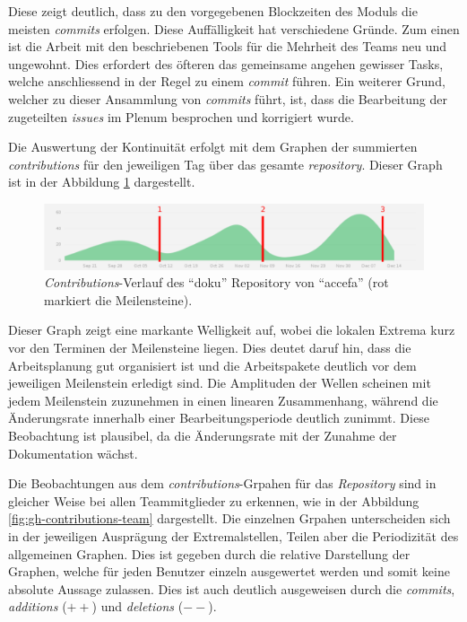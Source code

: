 Diese zeigt deutlich, dass zu den vorgegebenen Blockzeiten des Moduls
die meisten \emph{commits} erfolgen. Diese Auffälligkeit hat verschiedene
Gründe. Zum einen ist die Arbeit mit den beschriebenen Tools für die
Mehrheit des Teams neu und ungewohnt. Dies erfordert des öfteren das
gemeinsame angehen gewisser Tasks, welche anschliessend in der Regel zu
einem \emph{commit} führen. Ein weiterer Grund, welcher zu dieser
Ansammlung von \emph{commits} führt, ist, dass die Bearbeitung der
zugeteilten \emph{issues} im Plenum besprochen und korrigiert wurde.

Die Auswertung der Kontinuität erfolgt mit dem Graphen der summierten
\emph{contributions} für den jeweiligen Tag über das gesamte
\emph{repository}. Dieser Graph ist in der Abbildung 
\ref{fig:gh-contributions-ov} dargestellt.

\begin{figure}[h!]
	\centering
	\includegraphics[width=1\textwidth]{../../fig/pm/gh-contributions-ov_marked.pdf}
	\caption{\emph{Contributions}-Verlauf des ``doku'' Repository
		von ``accefa'' (rot markiert die Meilensteine).}
	\label{fig:gh-contributions-ov}
\end{figure}

Dieser Graph zeigt eine markante Welligkeit auf, wobei die lokalen Extrema
kurz vor den Terminen der Meilensteine liegen. Dies deutet daruf hin, dass
die Arbeitsplanung gut organisiert ist und die Arbeitspakete deutlich vor
dem jeweiligen Meilenstein erledigt sind. Die Amplituden der Wellen
scheinen mit jedem Meilenstein zuzunehmen in einen linearen Zusammenhang,
während die Änderungsrate innerhalb einer Bearbeitungsperiode deutlich zunimmt.
Diese Beobachtung ist plausibel, da die Änderungsrate mit der Zunahme der
Dokumentation wächst.

Die Beobachtungen aus dem \emph{contributions}-Grpahen für das
\emph{Repository} sind in gleicher Weise bei allen Teammitglieder zu erkennen,
wie in der Abbildung \ref{fig:gh-contributions-team} dargestellt. Die einzelnen
Grpahen unterscheiden sich in der jeweiligen Ausprägung der Extremalstellen,
Teilen aber die Periodizität des allgemeinen Graphen. Dies ist gegeben durch
die relative Darstellung der Graphen, welche für jeden Benutzer einzeln
ausgewertet werden und somit keine absolute Aussage zulassen. Dies ist auch
deutlich ausgeweisen durch die \emph{commits}, \emph{additions} ($++$) und
\emph{deletions} ($--$).

